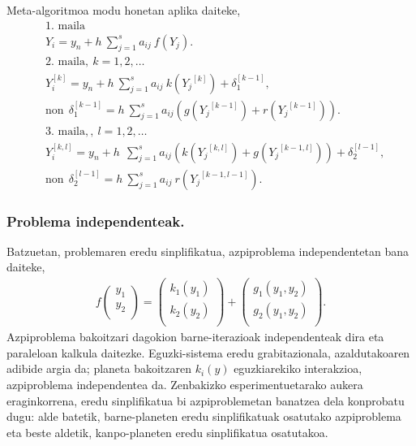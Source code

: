 Meta-algoritmoa modu honetan aplika daiteke,
\begin{align*}
&\mbox{1. maila}\\ 
&Y_i=y_n+h \ \sum^s_{j=1}{a_{ij} \ f(Y_j)}.\\
&\mbox{2. maila}, \ k=1,2,\dots\\
&Y_i^{[k]}=y_n+h\  \sum^s_{j=1}{a_{ij} \ k({Y_j}^{[k]})}+ \delta_1^{[k-1]},\\
& \text{non} \ \ \delta_1^{[k-1]}= h\  \sum^s_{j=1}{a_{ij} (g({Y_j}^{[k-1]})+r({Y_j}^{[k-1]}))}. \\
&\mbox{3. maila}, , \ l=1,2,\dots\\
&Y_i^{[k,l]}=y_n+h\ \ \sum^s_{j=1}{a_{ij} \left(k({Y_j}^{[k,l]})+g({Y_j}^{[k-1,l]})\right)}+\delta_2^{[l-1]}, \\
& \text{non} \ \ \delta_2^{[l-1]}= h \ \sum^s_{j=1}{a_{ij} \ r({Y_j}^{[k-1,l-1]})}.
\end{align*}


\subsubsection*{Problema independenteak.}

Batzuetan, problemaren eredu sinplifikatua, azpiproblema independentetan bana daiteke,
\begin{align*}
f\left ( \begin{array}{c}
   y_1 \\
   y_2 \\
\end{array} \right)=
\left ( \begin{array}{c}
   k_1(y_1) \\
   k_2(y_2) \\
\end{array} \right)+
\left ( \begin{array}{c}
   g_1(y_1,y_2) \\
   g_2(y_1,y_2) \\
\end{array} \right).
\end{align*}
%
Azpiproblema bakoitzari dagokion barne-iterazioak independenteak dira eta paraleloan kalkula daitezke. Eguzki-sistema eredu grabitazionala, azaldutakoaren adibide argia da; planeta bakoitzaren $k_i(y)$ eguzkiarekiko interakzioa, azpiproblema independentea da. Zenbakizko esperimentuetarako aukera eraginkorrena, eredu sinplifikatua bi azpiproblemetan banatzea dela konprobatu dugu: alde batetik, barne-planeten eredu sinplifikatuak osatutako azpiproblema eta beste aldetik, kanpo-planeten eredu sinplifikatua osatutakoa.    

